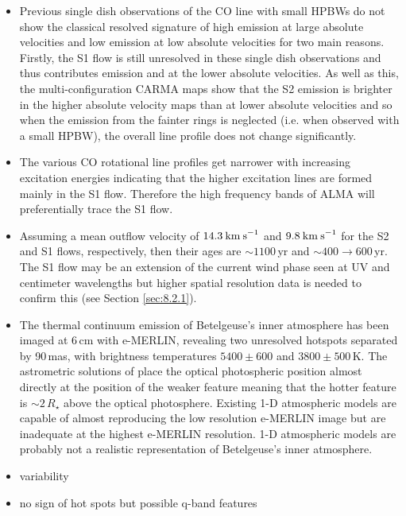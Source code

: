 \begin{itemize}
\item Previous single dish observations of the CO line with small HPBWs do not show the classical resolved signature of high emission at large absolute velocities and low emission at low absolute velocities for two main reasons. Firstly, the S1 flow is still unresolved in these single dish observations and thus contributes emission and at the lower absolute velocities. As well as this, the multi-configuration CARMA maps show that the S2 emission is brighter in the higher absolute velocity maps than at lower absolute velocities and so when the emission from the fainter rings is neglected (i.e. when observed with a small HPBW), the overall line profile does not change significantly.

\item The various CO rotational line profiles get narrower with increasing excitation energies indicating that the higher excitation lines are formed mainly in the S1 flow. Therefore the high frequency bands of ALMA will preferentially trace the S1 flow. 

\item Assuming a mean outflow velocity of $14.3\>{\rm km\>s}^{-1}$ and $9.8\>{\rm km\>s}^{-1}$ for the S2 and S1 flows, respectively, then their ages are $\sim 1100$\,yr and $\sim 400 \rightarrow 600$\,yr. The S1 flow may be an extension of the current wind phase seen at UV and centimeter wavelengths but higher spatial resolution data is needed to confirm this (see Section \ref{sec:8.2.1}).

\item The thermal continuum emission of Betelgeuse's inner atmosphere has been imaged at 6\,cm with e-MERLIN, revealing two unresolved hotspots separated by 90\,mas, with brightness temperatures $5400\pm 600$ and $3800\pm 500$\,K. The astrometric solutions of \cite{harper_2001} place the optical photospheric position almost directly at the position of the weaker feature meaning that the hotter feature is $\sim 2\,R_{\star}$ above the optical photosphere. Existing 1-D atmospheric models are capable of almost reproducing the low resolution e-MERLIN image but are inadequate at the highest e-MERLIN resolution. 1-D atmospheric models are probably not a realistic representation of Betelgeuse's inner atmosphere.

\item variability
\item no sign of hot spots but possible q-band features 
  
\end{itemize}


